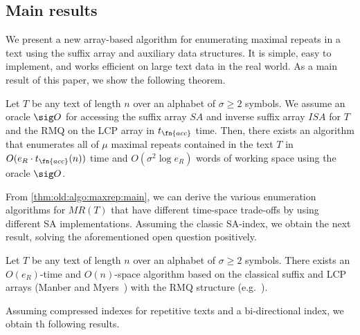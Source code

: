 
\subsection{Main results}

We present a new array-based algorithm for enumerating maximal repeats in a text using the suffix array and auxiliary data structures. It is simple, easy to implement, and works efficient on large text data in the real world. As a main result of this paper, we show the following theorem. 

\begin{theorem}\label{thm:old:algo:maxrep:main}
Let $T$ be any text of length $n$ over an alphabet of $\sigma\ge 2$ symbols. We assume an oracle $\sig O$ for accessing the suffix array $SA$ and inverse suffix array $ISA$ for $T$ and the RMQ on the LCP array in $t_\fn{acc}$ time. Then, there exists an algorithm that enumerates all of $\mu$ maximal repeats contained in the text $T$ in $O(e_R\cdot t_\fn{acc}(n))$ time and $O(\sigma^2 \log e_R)$ words of working space using the oracle $\sig O$. 
\end{theorem}

From \cref{thm:old:algo:maxrep:main}, we can derive the various enumeration algorithms for $MR(T)$ that have different time-space trade-offs by using different SA implementations.
Assuming the classic SA-index, we obtain the next result, solving the aforementioned open question positively. 

\begin{theorem}\label{thm:old:algo:maxrep:classic}
  Let $T$ be any text of length $n$ over an alphabet of $\sigma\ge 2$ symbols.
There exists an $O(e_R)$-time and $O(n)$-space algorithm based on the classical suffix and LCP arrays (Manber and Myers~\cite{manber:myers1993suffixarrays}) with the RMQ structure (e.g.~\cite{bender:colton2000thelcaproblem}). 
\end{theorem}

Assuming compressed indexes for repetitive texts and a bi-directional index, we obtain th following results. 

